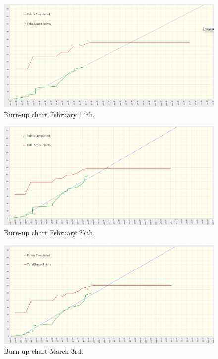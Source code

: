     \begin{figure}[H]
      \centering
      \includegraphics[width=12cm]{assets/outputs/burnups/02-14.png}
      \caption{Burn-up chart February 14th.}
      \label{fig:burnup4}
    \end{figure}
  
    \begin{figure}[H]
      \centering
      \includegraphics[width=12cm]{assets/outputs/burnups/02-27.png}
      \caption{Burn-up chart February 27th.}
      \label{fig:burnup5}
    \end{figure}
  
    \begin{figure}[H]
      \centering
      \includegraphics[width=12cm]{assets/outputs/burnups/03-03.png}
      \caption{Burn-up chart March 3rd.}
      \label{fig:burnup6}
    \end{figure}
  
